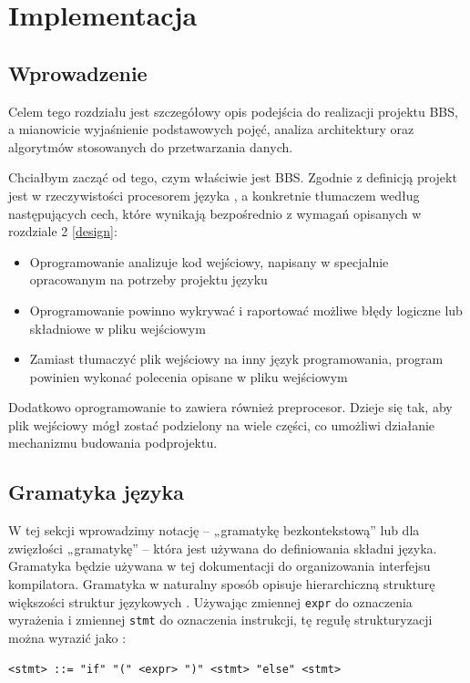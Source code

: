 \chapter{Implementacja}
\section{Wprowadzenie}
Celem tego rozdziału jest szczegółowy opis podejścia do realizacji projektu BBS, a mianowicie wyjaśnienie podstawowych pojęć, analiza architektury oraz algorytmów stosowanych do przetwarzania danych.

Chciałbym zacząć od tego, czym właściwie jest BBS. Zgodnie z definicją projekt jest w rzeczywistości procesorem języka \cite{compilers}, a konkretnie tłumaczem według następujących cech, które wynikają bezpośrednio z wymagań opisanych w rozdziale 2 \ref{design}:
\begin{itemize}
    \item Oprogramowanie analizuje kod wejściowy, napisany w specjalnie opracowanym na potrzeby projektu języku
    \item Oprogramowanie powinno wykrywać i raportować możliwe błędy logiczne lub składniowe w pliku wejściowym
    \item Zamiast tłumaczyć plik wejściowy na inny język programowania, program powinien wykonać polecenia opisane w pliku wejściowym
\end{itemize}

Dodatkowo oprogramowanie to zawiera również preprocesor. Dzieje się tak, aby plik wejściowy mógł zostać podzielony na wiele części, co umożliwi działanie mechanizmu budowania podprojektu.

\section{Gramatyka języka}

W tej sekcji wprowadzimy notację -- „gramatykę bezkontekstową” lub dla zwięzłości „gramatykę” -- która jest używana do definiowania składni języka. Gramatyka będzie używana w tej dokumentacji do organizowania interfejsu kompilatora. Gramatyka w naturalny sposób opisuje hierarchiczną strukturę większości struktur językowych \cite{compilers}. Używając zmiennej \texttt{expr} do oznaczenia wyrażenia i zmiennej \texttt{stmt} do oznaczenia instrukcji, tę regułę strukturyzacji można wyrazić jako :

\begin{lstlisting}[label=list:example_grammar,caption=Przykładowy opis gramatyki,basicstyle=\footnotesize\ttfamily]
<stmt> ::= "if" "(" <expr> ")" <stmt> "else" <stmt>
\end{lstlisting}

